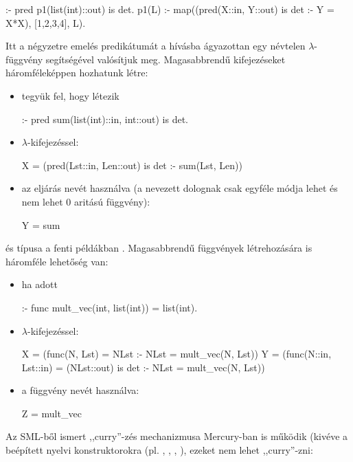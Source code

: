 \begin{prologcode} 
:- pred p1(list(int)::out) is det.
p1(L) :-
         map((pred(X::in, Y::out) is det :- Y = X*X), [1,2,3,4], L).
\end{prologcode}

Itt a négyzetre emelés predikátumát a  hívásba ágyazottan egy névtelen
$\lambda$-függvény segítségével valósítjuk meg.
\br
Magasabbrendű kifejezéseket háromféleképpen hozhatunk létre:

\begin{itemize}
\item tegyük fel, hogy létezik
\begin{prologcode}
:- pred sum(list(int)::in, int::out) is det.
\end{prologcode}
\item $\lambda$-kifejezéssel:
\begin{prologcode}
X = (pred(Lst::in, Len::out) is det :- sum(Lst, Len))
\end{prologcode}
\item az eljárás nevét használva (a nevezett dolognak csak egyféle módja lehet
és nem lehet 0 aritású függvény):
\begin{prologcode}
Y = sum
\end{prologcode}
\end{itemize}

 és  típusa a fenti példákban .
\br
Magasabbrendű függvények létrehozására is háromféle lehetőség van:

\begin{itemize}
\item ha adott
\begin{prologcode}
:- func mult_vec(int, list(int)) = list(int).
\end{prologcode}
\item $\lambda$-kifejezéssel:
\begin{prologcode}
X = (func(N, Lst) = NLst :- NLst = mult_vec(N, Lst))
Y = (func(N::in, Lst::in) = (NLst::out) is det
         :- NLst = mult_vec(N, Lst))
\end{prologcode}
\item a függvény nevét használva:
\begin{prologcode}
Z = mult_vec
\end{prologcode}
\end{itemize}


Az SML-ből ismert ,,curry''-zés mechanizmusa Mercury-ban is működik (kivéve
a beépített nyelvi konstruktorokra (pl. \cd{=}, \cd{\bs=}, , ),
ezeket nem lehet ,,curry''-zni:

